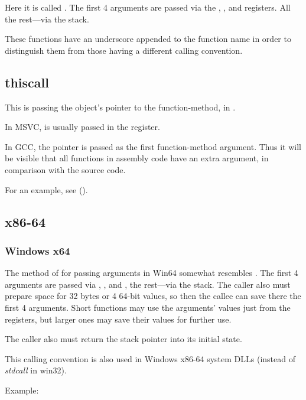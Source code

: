 Here it is called .
The first 4 arguments are passed via the \EAX, \EDX, \EBX and \ECX registers.
All the rest---via the stack.

These functions have an underscore appended to the function name in order to distinguish them from 
those having a different calling convention.

\subsection{thiscall}

This is passing the object's \ITthis pointer to the function-method, in \Cpp.

In MSVC, \ITthis is usually passed in the \ECX register.

In GCC, the \ITthis pointer is passed as the first function-method argument.
Thus it will be visible that all functions in assembly code have an extra argument, in comparison with the source code.

For an example, see ().

\subsection{x86-64}

\subsubsection{Windows x64}
\label{sec:callingconventions_win64}

The method of for passing arguments in Win64 somewhat resembles .
The first 4 arguments are passed via \RCX, \RDX,  and , the rest---via the stack.
The \gls{caller} also must prepare space for 32 bytes or 4 64-bit values,
so then the \gls{callee} can save there the first 4 arguments.
Short functions may use the arguments' values just from the registers,
but larger ones may save their values for further use.

The \gls{caller} also must return the \gls{stack pointer} into its initial state.

This calling convention is also used in Windows x86-64 system DLLs 
(instead of \emph{stdcall} in win32).

Example:





